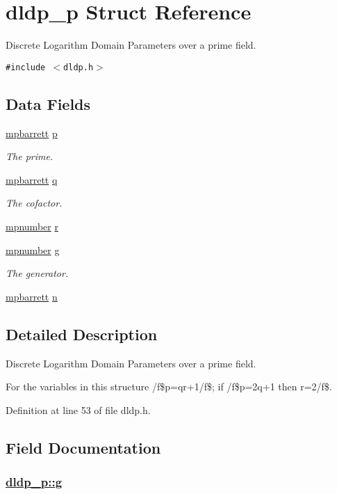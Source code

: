 \hypertarget{structdldp__p}{
\section{dldp\_\-p Struct Reference}
\label{structdldp__p}
}
Discrete Logarithm Domain Parameters over a prime field.  


{\tt \#include $<$dldp.h$>$}

\subsection*{Data Fields}
\begin{CompactItemize}
\item 
\hyperlink{structmpbarrett}{mpbarrett} \hyperlink{structdldp__p_o0}{p}
\begin{CompactList}\small\item\em The prime. \item\end{CompactList}\item 
\hyperlink{structmpbarrett}{mpbarrett} \hyperlink{structdldp__p_o1}{q}
\begin{CompactList}\small\item\em The cofactor. \item\end{CompactList}\item 
\hyperlink{structmpnumber}{mpnumber} \hyperlink{structdldp__p_o2}{r}
\item 
\hyperlink{structmpnumber}{mpnumber} \hyperlink{structdldp__p_o3}{g}
\begin{CompactList}\small\item\em The generator. \item\end{CompactList}\item 
\hyperlink{structmpbarrett}{mpbarrett} \hyperlink{structdldp__p_o4}{n}
\end{CompactItemize}


\subsection{Detailed Description}
Discrete Logarithm Domain Parameters over a prime field. 

For the variables in this structure /f\$p=qr+1/f\$; if /f\$p=2q+1 then r=2/f\$. 

Definition at line 53 of file dldp.h.

\subsection{Field Documentation}
\hypertarget{structdldp__p_o3}{
\subsubsection[g]{\setlength{\rightskip}{0pt plus 5cm}\hyperlink{structdldp__p_o3}{dldp\_\-p::g}}}
\label{structdldp__p_o3}


